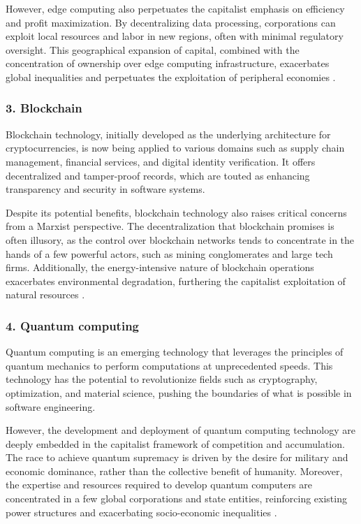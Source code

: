 \begin{refsection}
\begin{multicols}{2}
{However, edge computing also perpetuates the capitalist emphasis on efficiency and profit maximization. By decentralizing data processing, corporations can exploit local resources and labor in new regions, often with minimal regulatory oversight. This geographical expansion of capital, combined with the concentration of ownership over edge computing infrastructure, exacerbates global inequalities and perpetuates the exploitation of peripheral economies \cite{marx1976capital,vazquez2020edge}.

\subsubsection*{3. Blockchain}

Blockchain technology, initially developed as the underlying architecture for cryptocurrencies, is now being applied to various domains such as supply chain management, financial services, and digital identity verification. It offers decentralized and tamper-proof records, which are touted as enhancing transparency and security in software systems.

Despite its potential benefits, blockchain technology also raises critical concerns from a Marxist perspective. The decentralization that blockchain promises is often illusory, as the control over blockchain networks tends to concentrate in the hands of a few powerful actors, such as mining conglomerates and large tech firms. Additionally, the energy-intensive nature of blockchain operations exacerbates environmental degradation, furthering the capitalist exploitation of natural resources \cite{marx1844economic,huber2019energy}.

\subsubsection*{4. Quantum computing}

Quantum computing is an emerging technology that leverages the principles of quantum mechanics to perform computations at unprecedented speeds. This technology has the potential to revolutionize fields such as cryptography, optimization, and material science, pushing the boundaries of what is possible in software engineering.

However, the development and deployment of quantum computing technology are deeply embedded in the capitalist framework of competition and accumulation. The race to achieve quantum supremacy is driven by the desire for military and economic dominance, rather than the collective benefit of humanity. Moreover, the expertise and resources required to develop quantum computers are concentrated in a few global corporations and state entities, reinforcing existing power structures and exacerbating socio-economic inequalities \cite{zizek2008violence,harvey2003new}.
}

\end{multicols}
\end{refsection}
